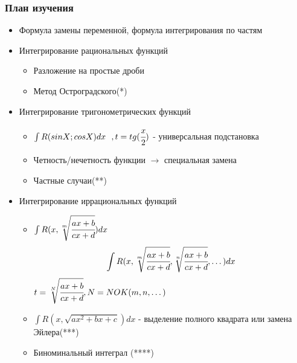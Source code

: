 \documentclass[a4paper]{article}
\theoremstyle{definition}
\newtheorem*{comment}{Замечание}
\numberwithin{theorem}{subsection}
\numberwithin{lemma}{subsection}
\numberwithin{definition}{subsection}
\numberwithin{comment*}{subsection}
\numberwithin{consequence}{subsection}
\numberwithin{property}{subsection}
\begin{document}
\subsubsection{План изучения}
\begin{itemize}
 \item Формула замены переменной, формула интегрирования по частям
 \item Интегрирование рациональных функций
       \begin{itemize}
        \item Разложение на простые дроби
        \item Метод Остроградского(*)
       \end{itemize}
 \item Интегрирование тригонометрических функций
       \begin{itemize}
        \item $\int R(sinX; cosX) dx \ \ ,  t=tg(\cfrac{x}{2})$ - универсальная подстановка
        \item Четность/нечетность функции $\rightarrow$ специальная замена
        \item Частные случаи(**)
       \end{itemize}
 \item Интегрирование иррациональных функций
       \begin{itemize}
        \item $\int R(x, \sqrt[m]{\cfrac{ax+b}{cx+d}}) dx$
              $$\int R(x, \sqrt[m]{\cfrac{ax+b}{cx+d}}, \sqrt[n]{\cfrac{ax+b}{cx+d}}, \dots ) dx $$
              $t = \sqrt[N]{\cfrac{ax+b}{cx+d}}, N = NOK(m,n, \dots)$
        \item $\int R(x, \sqrt{ax^2+bx+c}) dx$ - выделение полного квадрата или замена Эйлера(***)
        \item Биноминальный интеграл (****)
       \end{itemize}
\end{itemize}

\end{document}

